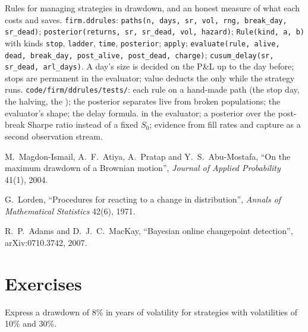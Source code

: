 \begin{build}
 Rules for managing strategies in drawdown, and an honest measure of what each costs and saves.
 \texttt{firm.ddrules}: \texttt{paths(n, days, sr, vol, rng, break\_day, sr\_dead)}; \texttt{posterior(returns, sr, sr\_dead,
vol, hazard)}; \texttt{Rule(kind, a, b)} with kinds \texttt{stop}, \texttt{ladder}, \texttt{time}, \texttt{posterior}; \texttt{apply};
\texttt{evaluate(rule, alive, dead, break\_day, post\_alive, post\_dead, charge)}; \texttt{cusum\_delay(sr, sr\_dead, arl\_days)}.
 A day's size is decided on the P\&L up to the day before; stops are permanent in the evaluator; value deducts the 
only while the strategy runs.
 \texttt{code/firm/ddrules/tests/}: each rule on a hand-made path (the stop day, the halving, the ); the
posterior separates live from broken populations; the evaluator's shape; the delay formula.
  in the evaluator; a posterior over the post-break Sharpe ratio instead of a fixed $S_0$; evidence from fill rates
and capture as a second observation stream.
\end{build}

\begin{omsources}
\item M.~Magdon-Ismail, A.~F.~Atiya, A.~Pratap and Y.~S.~Abu-Mostafa, ``On the maximum drawdown of a Brownian motion'', \emph{Journal of
Applied Probability} 41(1), 2004.
\item G.~Lorden, ``Procedures for reacting to a change in distribution'', \emph{Annals of Mathematical Statistics} 42(6), 1971.
\item R.~P.~Adams and D.~J.~C.~MacKay, ``Bayesian online changepoint detection'', arXiv:0710.3742, 2007.
\end{omsources}

\section{Exercises}

\begin{exercise}[$\star$]\label{exo:fm:managing-a-book-through-drawdown:1}
Express a drawdown of 8\% in years of volatility for strategies with volatilities of 10\% and 30\%.
\end{exercise}

